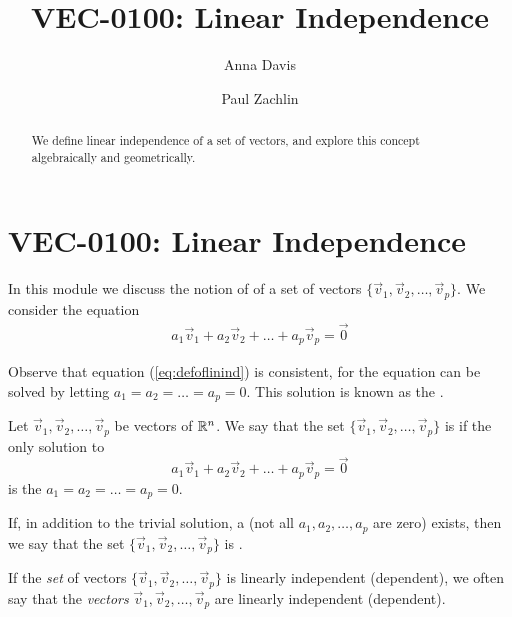 \documentclass{ximera}
\author{Anna Davis \and Paul Zachlin} \title{VEC-0100: Linear Independence} \license{CC-BY 4.0}
\begin{document}
\begin{abstract}
 We define linear independence of a set of vectors, and explore this concept algebraically and geometrically.
\end{abstract}
\maketitle

\section*{VEC-0100: Linear Independence}
In this module we discuss the notion of  of a set of vectors $\{\vec{v}_1, \vec{v}_2,\ldots ,\vec{v}_p\}$.  We consider the equation \begin{align}\label{eq:defoflinind}a_1\vec{v}_1+a_2\vec{v}_2+\ldots +a_p\vec{v}_p=\vec{0}\end{align}
 
Observe that equation (\ref{eq:defoflinind}) is consistent, for the equation can be solved by letting  $a_1=a_2=\ldots =a_p=0$.  This solution is known as the .

\begin{definition}\label{def:linearindependence}
Let $\vec{v}_1, \vec{v}_2,\ldots ,\vec{v}_p$ be vectors of $\mathbb{R}^n$.  We say that the set $\{\vec{v}_1, \vec{v}_2,\ldots ,\vec{v}_p\}$ is  if the only solution to 
$$a_1\vec{v}_1+a_2\vec{v}_2+\ldots +a_p\vec{v}_p=\vec{0}$$
is the  $a_1=a_2=\ldots =a_p=0$.

If, in addition to the trivial solution, a  (not all $a_1, a_2,\ldots ,a_p$ are zero) exists, then we say that the set $\{\vec{v}_1, \vec{v}_2,\ldots ,\vec{v}_p\}$ is .
\end{definition}

If the {\it set} of vectors $\{\vec{v}_1, \vec{v}_2,\ldots ,\vec{v}_p\}$ is linearly independent (dependent), we often say that the {\it vectors} $\vec{v}_1, \vec{v}_2,\ldots ,\vec{v}_p$ are linearly independent (dependent).

\end{document}
